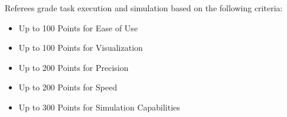 Referees grade task execution and simulation based on the following criteria:
\begin{itemize}
  \item Up to 100 Points for Ease of Use
  \item Up to 100 Points for Visualization
  \item Up to 200 Points for Precision
  \item Up to 200 Points for Speed
  \item Up to 300 Points for Simulation Capabilities
\end{itemize}


